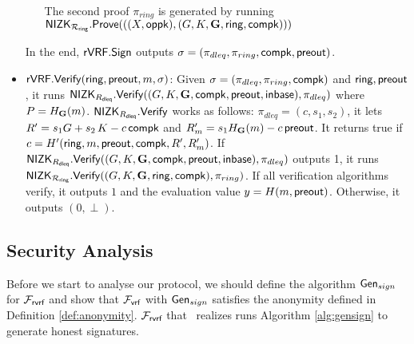 \begin{itemize}
\begin{itemize}
		
		The second proof $ \pi_{ring} $ is generated by running 
		$ {\mathsf{NIZK}}_{\mathcal{R}_{\mathsf{ring}}}.{\mathsf{Prove}}(((X, \mathsf{oppk}),(G,K,{\mathbf{G}},\mathsf{ring}, \mathsf{compk}))) $ 
	\end{itemize}
	In the end, $ {\mathsf{rVRF}}.{\mathsf{Sign}} $ outputs $\sigma = (\pi_{dleq}, \pi_{ring}, \mathsf{compk}, {\mathsf{preout}}) $.
	
	\item $ {\mathsf{rVRF}}.{\mathsf{Verify}}(\mathsf{ring},{\mathsf{preout}}, m, \sigma) $: Given $  \sigma = (\pi_{dleq}, \pi_{ring},\mathsf{compk})  $ and $ \mathsf{ring}, {\mathsf{preout}} $,
	it runs $ {\mathsf{NIZK}}_{R_{\mathsf{dleq}}}.{\mathsf{Verify}}((G, K,{\mathbf{G}},\mathsf{compk},{\mathsf{preout}},{\mathsf{inbase}}), \pi_{dleq} ) $ where $ P = H_{\mathbf{G}}(m) $. $ {\mathsf{NIZK}}_{R_{\mathsf{dleq}}}.{\mathsf{Verify}} $ works as follows: $ \pi_{dleq} = (c,s_1, s_2) $, it lets $R' = s_1 G + s_2 \, K - c \,\mathsf{compk}$ and $R'_m = s_1 H_{\mathbf{G}}(m) - c \, {\mathsf{preout}}$. It
	returns true if $c = H'(\mathsf{ring},m,{\mathsf{preout}},\mathsf{compk},R',R'_m)$. If  $ {\mathsf{NIZK}}_{R_{\mathsf{dleq}}}.{\mathsf{Verify}}((G, K,{\mathbf{G}},\mathsf{compk},{\mathsf{preout}},{\mathsf{inbase}}), \pi_{dleq} ) $ outputs 1, it runs $ {\mathsf{NIZK}}_{\mathcal{R}_{\mathsf{ring}}}.{\mathsf{Verify}}((G,K,{\mathbf{G}},\mathsf{ring}, \mathsf{compk}), \pi_{ring}) $. 
	If all verification algorithms verify, it outputs $ 1 $ and the evaluation value $ y =  H(m,{\mathsf{preout}})  $. Otherwise, it outputs $( 0, \perp) $.
	
\end{itemize}

\subsection{Security Analysis}

Before we start to analyse our protocol, we should define the algorithm $ \mathsf{Gen}_{sign} $  for $ \mathcal{F}_{\textsf{rvrf}} $ and show that $ \mathcal{F}_{\textsf{vrf}} $ with $ \mathsf{Gen}_{sign} $ satisfies the anonymity defined in Definition \ref{def:anonymity}. $ \mathcal{F}_{\textsf{rvrf}} $ that \name \ realizes runs  Algorithm \ref{alg:gensign} to generate honest signatures.



%	

